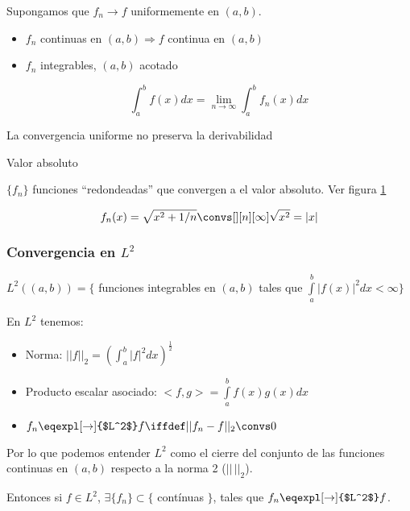 		\begin{theorem}

			Supongamos que $f_n \rightarrow f$ uniformemente en $(a,b)$.

			\begin{itemize}
				\item $f_n$ continuas en $(a,b) \Rightarrow f$ continua en $(a,b)$

				\item $f_n$ integrables, $(a,b)$ acotado

				\[\int^{b}_{a} f(x) dx = \lim_{n \rightarrow \infty} \int^{b}_{a} f_n(x) dx \]
			\end{itemize}

			\obs La convergencia uniforme no preserva la derivabilidad

		\end{theorem}

		\begin{example}{Valor absoluto}

			$\{f_n\}$ funciones ``redondeadas'' que convergen a el valor absoluto. Ver figura \ref{fig:convergenciaValorAbsoluto}

			\begin{figure}[thbp]
			\centering
			\caption{}
			\label{fig:convergenciaValorAbsoluto}
			\end{figure}

			\[f_n(x) = \sqrt{x^2 + 1/n} \convs[][n][\infty] \sqrt{x^2} = |x| \]

		\end{example}

	\subsubsection{Convergencia en $L^2$}

		\begin{defn}[Convergencia\IS en $L^2$]

			$L^2((a,b)) = \{$ funciones integrables en $(a,b)$ tales que $\int\limits_{a}^{b} |f(x)|^2 dx < \infty \}$

			En $L^2$ tenemos:
			\begin{itemize}
				\item Norma: $||f||_2 = \left( \int^{b}_{a} |f|^2 dx \right)^{\frac{1}{2}}$

				\item Producto escalar asociado: $<f,g> = \int\limits^b_a f(x) g(x) dx $

				\item $f_n \eqexpl[\rightarrow]{$L^2$} f \iffdef ||f_n - f||_2 \convs 0 $
			\end{itemize}

			Por lo que podemos entender $L^2$ como el cierre del conjunto de las funciones continuas en $(a,b)$ respecto a la norma 2 ($||\,||_2$).

			Entonces si $f \in L^2$, $\exists \{f_n\} \subset \{$ contínuas $\}$, tales que $f_n \eqexpl[\rightarrow]{$L^2$}f$.
		\end{defn}

